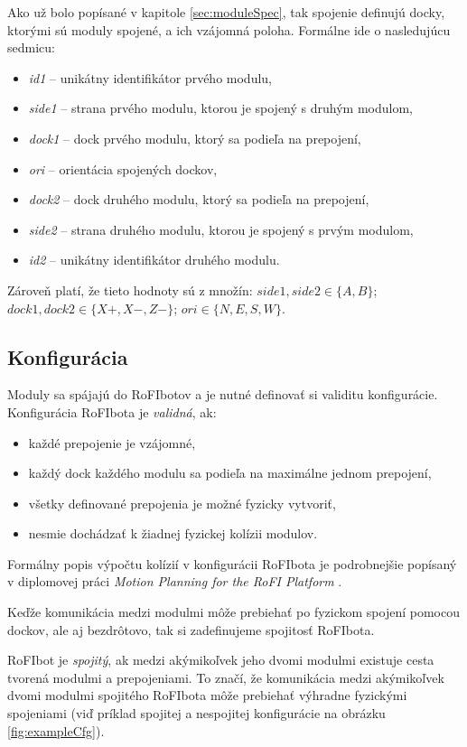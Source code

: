 \documentclass[
  digital, %
  oneside, %
  table,   %
  lof,     %
  nolot,     %
]{fithesis3}
\begin{document}
Ako už bolo popísané v kapitole \ref{sec:moduleSpec}, tak spojenie definujú docky, ktorými sú moduly spojené, a ich vzájomná poloha. Formálne ide o nasledujúcu sedmicu: 
\begin{itemize}
    \item \textit{id1} -- unikátny identifikátor prvého modulu, 
    \item \textit{side1} -- strana prvého modulu, ktorou je spojený s druhým modulom, 
    \item \textit{dock1} -- dock prvého modulu, ktorý sa podieľa na prepojení,
    \item \textit{ori} -- orientácia spojených dockov,
    \item \textit{dock2} -- dock druhého modulu, ktorý sa podieľa na prepojení,
    \item \textit{side2} -- strana druhého modulu, ktorou je spojený s prvým modulom, 
    \item \textit{id2} -- unikátny identifikátor druhého modulu. 
\end{itemize}
Zároveň platí, že tieto hodnoty sú z množín: $side1, side2 \in \{A, B\}$; $dock1, dock2 \in \{X+, X-, Z-\}$; $ori \in \{N, E, S, W\}$.

\subsection{Konfigurácia}
\label{sec:formalSpecCfg}
Moduly sa spájajú do RoFIbotov a je nutné definovať si validitu konfigurácie. Konfigurácia RoFIbota je \textit{validná}, ak: 
\begin{itemize}
    \item každé prepojenie je vzájomné,
    \item každý dock každého modulu sa podieľa na maximálne jednom prepojení, 
    \item všetky definované prepojenia je možné fyzicky vytvoriť, 
    \item nesmie dochádzať k žiadnej fyzickej kolízii modulov. 
\end{itemize}
Formálny popis výpočtu kolízií v konfigurácii RoFIbota je podrobnejšie popísaný v diplomovej práci \textit{Motion Planning for the RoFI Platform} \cite{vozarovaMasterThesis}. 

Keďže komunikácia medzi modulmi môže prebiehať po fyzickom spojení pomocou dockov, ale aj bezdrôtovo, tak si zadefinujeme spojitosť RoFIbota. 

RoFIbot je \textit{spojitý}, ak medzi akýmikoľvek jeho dvomi modulmi existuje cesta tvorená modulmi a prepojeniami. To značí, že komunikácia medzi akýmikoľvek dvomi modulmi spojitého RoFIbota môže prebiehať výhradne fyzickými spojeniami (viď príklad spojitej a nespojitej konfigurácie na obrázku \ref{fig:exampleCfg}). 
\end{document}
